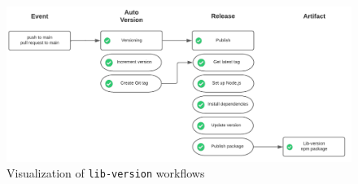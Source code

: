 \begin{figure}
    \centering
    \includegraphics[width=0.75\linewidth]{images/libversion_workflow.png}
    \caption{Visualization of \texttt{lib-version} workflows}
    \label{fig:libversion-workflow}
\end{figure}

